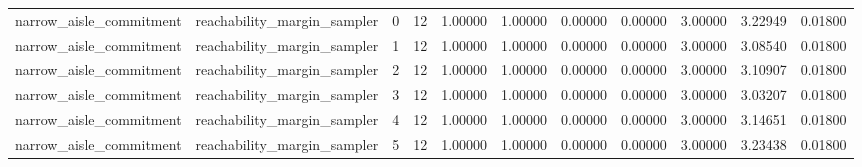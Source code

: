 \documentclass{article}
\begin{document}
\begin{table}[tbp]
{\begin{tabular}{lllllllllll}
narrow\_aisle\_commitment & reachability\_margin\_sampler & 0 & 12 & 1.00000 & 1.00000 & 0.00000 & 0.00000 & 3.00000 & 3.22949 & 0.01800 \\
narrow\_aisle\_commitment & reachability\_margin\_sampler & 1 & 12 & 1.00000 & 1.00000 & 0.00000 & 0.00000 & 3.00000 & 3.08540 & 0.01800 \\
narrow\_aisle\_commitment & reachability\_margin\_sampler & 2 & 12 & 1.00000 & 1.00000 & 0.00000 & 0.00000 & 3.00000 & 3.10907 & 0.01800 \\
narrow\_aisle\_commitment & reachability\_margin\_sampler & 3 & 12 & 1.00000 & 1.00000 & 0.00000 & 0.00000 & 3.00000 & 3.03207 & 0.01800 \\
narrow\_aisle\_commitment & reachability\_margin\_sampler & 4 & 12 & 1.00000 & 1.00000 & 0.00000 & 0.00000 & 3.00000 & 3.14651 & 0.01800 \\
narrow\_aisle\_commitment & reachability\_margin\_sampler & 5 & 12 & 1.00000 & 1.00000 & 0.00000 & 0.00000 & 3.00000 & 3.23438 & 0.01800 \\
\bottomrule
\end{tabular}
}
\end{table}

\clearpage
\end{document}
